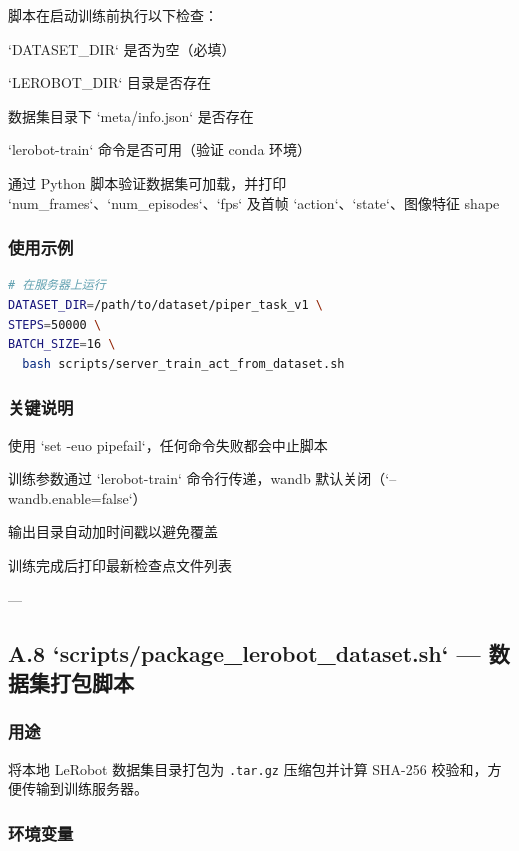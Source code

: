 \documentclass[UTF8,a4paper,11pt]{ctexart}
\begin{document}
{脚本在启动训练前执行以下检查：

\item[1] `DATASET_DIR` 是否为空（必填）
\item[2] `LEROBOT_DIR` 目录是否存在
\item[3] 数据集目录下 `meta/info.json` 是否存在
\item[4] `lerobot-train` 命令是否可用（验证 conda 环境）
\item[5] 通过 Python 脚本验证数据集可加载，并打印 `num_frames`、`num_episodes`、`fps` 及首帧 `action`、`state`、图像特征 shape

\subsubsection{使用示例}

\begin{lstlisting}[language=bash]
# 在服务器上运行
DATASET_DIR=/path/to/dataset/piper_task_v1 \
STEPS=50000 \
BATCH_SIZE=16 \
  bash scripts/server_train_act_from_dataset.sh
\end{lstlisting}

\subsubsection{关键说明}

\item 使用 `set -euo pipefail`，任何命令失败都会中止脚本
\item 训练参数通过 `lerobot-train` 命令行传递，wandb 默认关闭（`--wandb.enable=false`）
\item 输出目录自动加时间戳以避免覆盖
\item 训练完成后打印最新检查点文件列表

---

\subsection{A.8 `scripts/package_lerobot_dataset.sh` — 数据集打包脚本}

\subsubsection{用途}

将本地 LeRobot 数据集目录打包为 \texttt{.tar.gz} 压缩包并计算 SHA-256 校验和，方便传输到训练服务器。

\subsubsection{环境变量}

}
\end{document}
